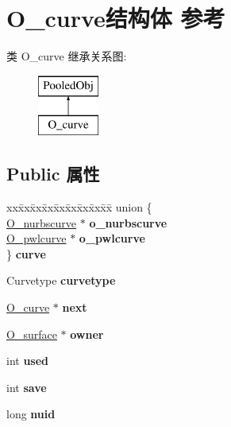 \hypertarget{struct_o__curve}{}\section{O\+\_\+curve结构体 参考}
\label{struct_o__curve}
类 O\+\_\+curve 继承关系图\+:\begin{figure}[H]
\begin{center}
\leavevmode
\includegraphics[height=2.000000cm]{struct_o__curve}
\end{center}
\end{figure}
\subsection*{Public 属性}
\begin{DoxyCompactItemize}
\item 
\mbox{\label{struct_o__curve_a9f2e6585b6e022720dfb4b471d26819e}} 
\begin{tabbing}
xx\=xx\=xx\=xx\=xx\=xx\=xx\=xx\=xx\=\kill
union \{\\
\>\hyperlink{struct_o__nurbscurve}{O\_nurbscurve} $\ast$ {\bfseries o\_nurbscurve}\\
\>\hyperlink{class_o__pwlcurve}{O\_pwlcurve} $\ast$ {\bfseries o\_pwlcurve}\\
\} {\bfseries curve}\\

\end{tabbing}\item 
\mbox{\label{struct_o__curve_a092e384bc947aca06da7653c60fdc419}} 
Curvetype {\bfseries curvetype}
\item 
\mbox{\label{struct_o__curve_a8d8ff50d79317710147de9bc6dc76b7b}} 
\hyperlink{struct_o__curve}{O\+\_\+curve} $\ast$ {\bfseries next}
\item 
\mbox{\label{struct_o__curve_a8437d93cd292bf88a2c84f5bc70d16fb}} 
\hyperlink{struct_o__surface}{O\+\_\+surface} $\ast$ {\bfseries owner}
\item 
\mbox{\label{struct_o__curve_a708e3b75063b02e8bc091f913d6c90d1}} 
int {\bfseries used}
\item 
\mbox{\label{struct_o__curve_a224cbc483b8e204e403588576841f536}} 
int {\bfseries save}
\item 
\mbox{\label{struct_o__curve_a3322bf95aa0277a37ca8bf93eb8ecd5e}} 
long {\bfseries nuid}
\end{DoxyCompactItemize}
